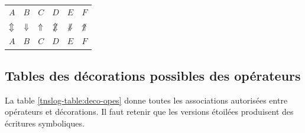 \documentclass[12pt,a4paper]{book}
\theoremstyle{definition}
\begin{document}
{{\begin{latexex}
\begin{tabular}{cccccc}
    $A$          & $B$
  & $C$          & $D$
  & $E$          & $F$
  \\
    $\mathrel{\Updownarrow}$      & $\mathrel{\Downarrow}$   
  & $\mathrel{\Uparrow}$  & $\nviff$
  & $\nvimplies$ & $\nvliesimp$
  \\
    $A$          & $B$
  & $C$          & $D$
  & $E$          & $F$
\end{tabular}
\end{latexex}



\subsection{Tables des décorations possibles des opérateurs}

La table \ref{tnslog-table:deco-opes}  donne toutes les associations autorisées entre opérateurs et décorations.
Il faut retenir que les versions étoilées produisent des écritures symboliques. 



}}
\end{document}
